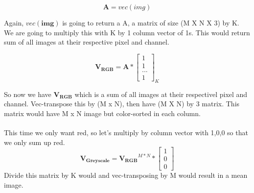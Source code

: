 \documentclass{article}
\newcommand{\matr}[1]{\mathbf{#1}}
\begin{document}
		\begin{equation*}
		\matr{A} = vec(img)
		\end{equation*}

		Again, $vec(\matr{img})$ is going to return a A, a matrix of size (M X N X 3) by K. We are going to multiply this with K by 1 column vector of 1s. 
		This would return sum of all images at their respective pixel and channel.

		\begin{equation*}
		\matr{V_{RGB}} = \matr{A} * 
						\begin{bmatrix} 
						1 \\ 1 \\ ... \\ 1 
						\end{bmatrix}_{K}
		\end{equation*}	
		
		So now we have $\matr{V_{RGB}}$ which is a sum of all images at their respectivel pixel and channel. Vec-transpose this by (M x N), then have (M X N) by 3 matrix. This matrix would have M x N image but color-sorted in each column. \\
		\\
		This time we only want red, so let's multiply by column vector with 1,0,0 so that we only sum up red.
		\begin{equation*}
		\matr{V_{Greyscale}} = \matr{V_{RGB}}^{M * N} * 
						\begin{bmatrix} 
						1 \\ 0 \\ 0  
						\end{bmatrix} 
		\end{equation*}	
		Divide this matrix by K would and vec-transposing by M would result in a mean image.
		
		
\end{document}
